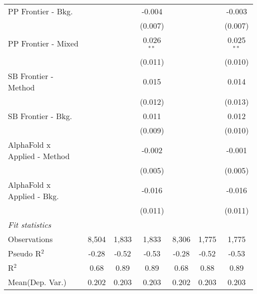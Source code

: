 \begin{tabular}{lcccccc}
   PP Frontier - Bkg.           &                &              & -0.004       &                &              & -0.003\\   
                                &                &              & (0.007)      &                &              & (0.007)\\   
   PP Frontier - Mixed          &                &              & 0.026$^{**}$ &                &              & 0.025$^{**}$\\   
                                &                &              & (0.011)      &                &              & (0.010)\\   
   SB Frontier - Method         &                &              & 0.015        &                &              & 0.014\\   
                                &                &              & (0.012)      &                &              & (0.013)\\   
   SB Frontier - Bkg.           &                &              & 0.011        &                &              & 0.012\\   
                                &                &              & (0.009)      &                &              & (0.010)\\   
   AlphaFold x Applied - Method &                &              & -0.002       &                &              & -0.001\\   
                                &                &              & (0.005)      &                &              & (0.005)\\   
   AlphaFold x Applied - Bkg.   &                &              & -0.016       &                &              & -0.016\\   
                                &                &              & (0.011)      &                &              & (0.011)\\   
   \midrule
   \emph{Fit statistics}\\
   Observations                 & 8,504          & 1,833        & 1,833        & 8,306          & 1,775        & 1,775\\  
   Pseudo R$^2$                 & -0.28          & -0.52        & -0.53        & -0.28          & -0.52        & -0.53\\  
   R$^2$                        & 0.68           & 0.89         & 0.89         & 0.68           & 0.88         & 0.89\\  
Mean(Dep. Var.) & 0.202 & 0.203 & 0.203 & 0.202 & 0.203 & 0.203 \\
   

\end{tabular}
